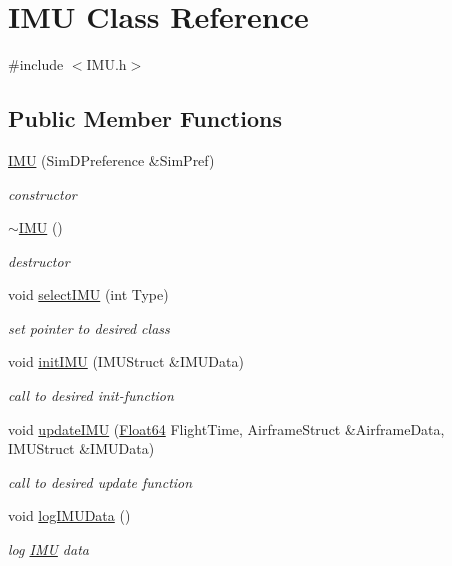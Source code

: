 \hypertarget{class_i_m_u}{}\section{I\+MU Class Reference}
\label{class_i_m_u}


{\ttfamily \#include $<$I\+M\+U.\+h$>$}

\subsection*{Public Member Functions}
\begin{DoxyCompactItemize}
\item 
\hyperlink{class_i_m_u_a306cae49e477064988b1bf6d497213c6}{I\+MU} (Sim\+D\+Preference \&Sim\+Pref)
\begin{DoxyCompactList}\small\item\em constructor \end{DoxyCompactList}\item 
\hyperlink{class_i_m_u_ad1f213d1e6aa08988ff683feab721559}{$\sim$\+I\+MU} ()
\begin{DoxyCompactList}\small\item\em destructor \end{DoxyCompactList}\item 
void \hyperlink{class_i_m_u_a6a3c828e32f2a299829aba91ede177e2}{select\+I\+MU} (int Type)
\begin{DoxyCompactList}\small\item\em set pointer to desired class \end{DoxyCompactList}\item 
void \hyperlink{class_i_m_u_ae6159fdadab4855ca9a9bf6fccc6c078}{init\+I\+MU} (I\+M\+U\+Struct \&I\+M\+U\+Data)
\begin{DoxyCompactList}\small\item\em call to desired init-\/function \end{DoxyCompactList}\item 
void \hyperlink{class_i_m_u_a5d5eae8dd965895cde879f51f83bcf3c}{update\+I\+MU} (\hyperlink{group___tools_ga3f1431cb9f76da10f59246d1d743dc2c}{Float64} Flight\+Time, Airframe\+Struct \&Airframe\+Data, I\+M\+U\+Struct \&I\+M\+U\+Data)
\begin{DoxyCompactList}\small\item\em call to desired update function \end{DoxyCompactList}\item 
void \hyperlink{class_i_m_u_a3317b4c96f0f53c74d8c004eca0db59e}{log\+I\+M\+U\+Data} ()
\begin{DoxyCompactList}\small\item\em log \hyperlink{class_i_m_u}{I\+MU} data \end{DoxyCompactList}\end{DoxyCompactItemize}


